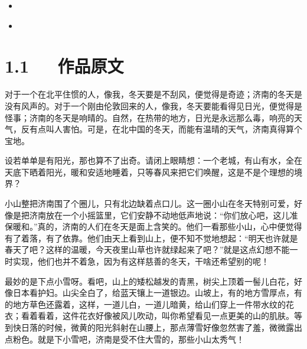 \documentclass[letterpaper,10pt,english]{sphinxmanual}
\begin{document}
\begin{sphinxShadowBox}
\begin{itemize}
\begin{itemize}
\begin{itemize}
\item {} 
\label{\detokenize{p01_u6563_u6587/_u8001_u820d-_u6d4e_u5357_u7684_u51ac_u5929:id18}}{\hyperref[\detokenize{p01_u6563_u6587/_u8001_u820d-_u6d4e_u5357_u7684_u51ac_u5929:id9}]{}}

\item {} 
\label{\detokenize{p01_u6563_u6587/_u8001_u820d-_u6d4e_u5357_u7684_u51ac_u5929:id19}}{\hyperref[\detokenize{p01_u6563_u6587/_u8001_u820d-_u6d4e_u5357_u7684_u51ac_u5929:id10}]{}}

\end{itemize}

\end{itemize}

\end{itemize}
\end{sphinxShadowBox}


\section{1.1   作品原文}
\label{\detokenize{p01_u6563_u6587/_u8001_u820d-_u6d4e_u5357_u7684_u51ac_u5929:id3}}
对于一个在北平住惯的人，像我，冬天要是不刮风，便觉得是奇迹；济南的冬天是没有风声的。对于一个刚由伦敦回来的人，像我，冬天要能看得见日光，便觉得是怪事；济南的冬天是响晴的。自然，在热带的地方，日光是永远那么毒，响亮的天气，反有点叫人害怕。可是，在北中国的冬天，而能有温晴的天气，济南真得算个宝地。

设若单单是有阳光，那也算不了出奇。请闭上眼睛想：一个老城，有山有水，全在天底下晒着阳光，暖和安适地睡着，只等春风来把它们唤醒，这是不是个理想的境界？

小山整把济南围了个圈儿，只有北边缺着点口儿。这一圈小山在冬天特别可爱，好像是把济南放在一个小摇篮里，它们安静不动地低声地说：“你们放心吧，这儿准保暖和。”真的，济南的人们在冬天是面上含笑的。他们一看那些小山，心中便觉得有了着落，有了依靠。他们由天上看到山上，便不知不觉地想起：“明天也许就是春天了吧？这样的温暖，今天夜里山草也许就绿起来了吧？”就是这点幻想不能一时实现，他们也并不着急，因为有这样慈善的冬天，干啥还希望别的呢！

最妙的是下点小雪呀。看吧，山上的矮松越发的青黑，树尖上顶着一髻儿白花，好像日本看护妇。山尖全白了，给蓝天镶上一道银边。山坡上，有的地方雪厚点，有的地方草色还露着，这样，一道儿白，一道儿暗黄，给山们穿上一件带水纹的花衣；看着看着，这件花衣好像被风儿吹动，叫你希望看见一点更美的山的肌肤。等到快日落的时候，微黄的阳光斜射在山腰上，那点薄雪好像忽然害了羞，微微露出点粉色。就是下小雪吧，济南是受不住大雪的，那些小山太秀气！
\end{document}
